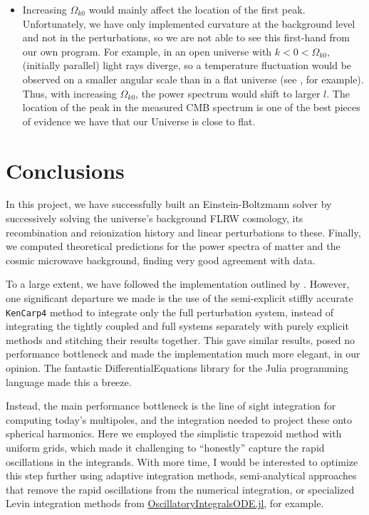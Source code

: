 \documentclass[10pt,a4paper]{article}
\begin{document}
\begin{itemize}
\item
Increasing $\Omega_{k0}$ would mainly affect the location of the first peak.
Unfortunately, we have only implemented curvature at the background level and not in the perturbations,
so we are not able to see this first-hand from our own program.
For example, in an open universe with $k < 0 < \Omega_{k0}$,
(initially parallel) light rays diverge,
so a temperature fluctuation would be observed on a smaller angular scale
than in a flat universe (see \cite[figure 9.14]{dodelsonModernCosmology2021}, for example).
Thus, with increasing $\Omega_{k0}$,
the power spectrum would shift to larger $l$.
The location of the peak in the measured CMB spectrum
is one of the best pieces of evidence we have
that our Universe is close to flat.
\end{itemize}

\clearpage
\section{Conclusions}

In this project,
we have successfully built an Einstein-Boltzmann solver by successively solving the universe's
background FLRW cosmology, its recombination and reionization history and linear perturbations to these.
Finally, we computed theoretical predictions for the power spectra of matter and the cosmic microwave background,
finding very good agreement with data.

To a large extent, we have followed the implementation outlined by \cite{callinHowCalculateCMB2006,wintherCosmologyIINumerical}.
However, one significant departure we made
is the use of the semi-explicit stiffly accurate \texttt{KenCarp4} method to integrate only the full perturbation system,
instead of integrating the tightly coupled and full systems separately with purely explicit methods and stitching their results together.
This gave similar results, posed no performance bottleneck and made the implementation much more elegant, in our opinion.
The fantastic DifferentialEquations library for the Julia programming language made this a breeze.

Instead, the main performance bottleneck is the
line of sight integration for computing today's multipoles,
and the integration needed to project these onto spherical harmonics.
Here we employed the simplistic trapezoid method with uniform grids,
which made it challenging to ``honestly'' capture the rapid oscillations in the integrands.
With more time, I would be interested to optimize this step further using
adaptive integration methods,
semi-analytical approaches that remove the rapid oscillations from the numerical integration,
or specialized Levin integration methods from \href{https://github.com/xzackli/OscillatoryIntegralsODE.jl}{OscillatoryIntegralsODE.jl}, for example.
\end{document}

